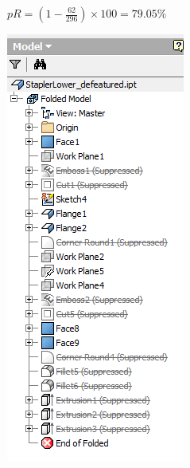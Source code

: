 \begin{minipage}{\linewidth}
\begin{minipage}[c]{0.62\linewidth}
$pR = (1 - \frac{62}{296}) \times 100 = 79.05\%$
\end{minipage}
\quad
\begin{minipage}[c]{0.3\linewidth}
\includegraphics[width=\linewidth,valign=t]{images/StaplerLower_defeatured_tree}
 \label{fig:results:staplerlowerdefeattree}
\end{minipage}
\end{minipage}


